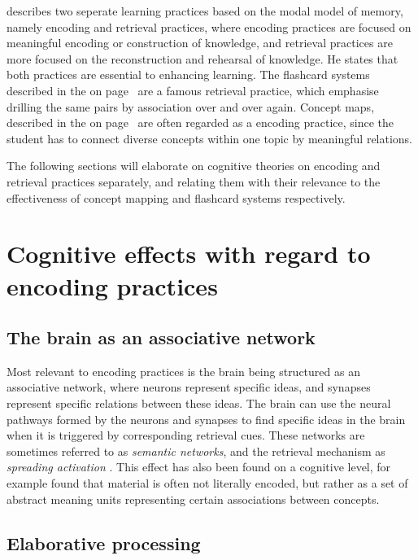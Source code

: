  describes two seperate learning practices based on the modal model of memory, namely encoding and retrieval practices, where encoding practices are focused on meaningful encoding or construction of knowledge, and retrieval practices are more focused on the reconstruction and rehearsal of knowledge. He states that both practices are essential to enhancing learning. The flashcard systems described in the  on page~\pageref{sec:intro_fc} are a famous retrieval practice, which emphasise drilling the same pairs by association over and over again. Concept maps, described in the  on page~\pageref{sec:intro_cmap} are often regarded as a encoding practice, since the student has to connect diverse concepts within one topic by meaningful relations.

The following sections will elaborate on cognitive theories on encoding and retrieval practices separately, and relating them with their relevance to the effectiveness of concept mapping and flashcard systems respectively.

\section{Cognitive effects with regard to encoding practices}

\subsection{The brain as an associative network}

Most relevant to encoding practices is the brain being structured as an associative network, where neurons represent specific ideas, and synapses represent specific relations between these ideas. The brain can use the neural pathways formed by the neurons and synapses to find specific ideas in the brain when it is triggered by corresponding retrieval cues. These networks are sometimes referred to as \emph{semantic networks}, and the retrieval mechanism as \emph{spreading activation} \cite{cognitivepsychology}. This effect has also been found on a cognitive level, for example  found that material is often not literally encoded, but rather as a set of abstract meaning units representing certain associations between concepts.

\subsection{Elaborative processing}

